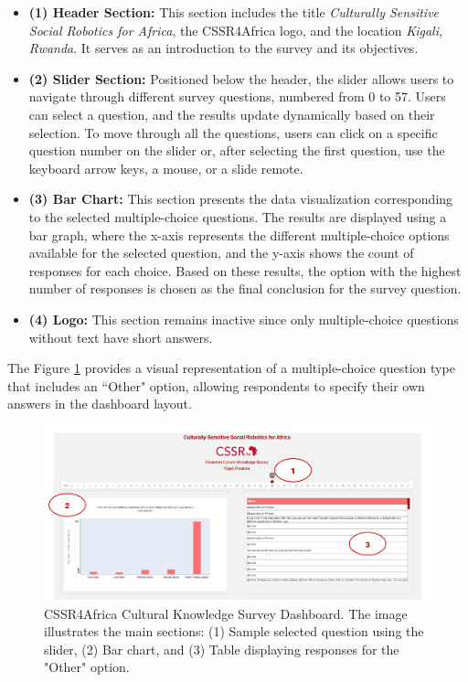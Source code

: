 \documentclass{CSSRforAfrica}
\begin{document}
\begin{itemize}
    \item \textbf{(1) Header Section:} This section includes the title \textit{Culturally Sensitive Social Robotics for Africa}, the CSSR4Africa logo, and the location \textit{Kigali, Rwanda}. It serves as an introduction to the survey and its objectives.
    
    \item \textbf{(2) Slider Section:} Positioned below the header, the slider allows users to navigate through different survey questions, numbered from 0 to 57. Users can select a question, and the results update dynamically based on their selection. To move through all the questions, users can click on a specific question number on the slider or, after selecting the first question, use the keyboard arrow keys, a mouse, or a slide remote.
    
    \item \textbf{(3) Bar Chart:} This section presents the data visualization corresponding to the selected multiple-choice questions. The results are displayed using a bar graph, where the x-axis represents the different multiple-choice options available for the selected question, and the y-axis shows the count of responses for each choice. Based on these results, the option with the highest number of responses is chosen as the final conclusion for the survey question.
    
    \item \textbf{(4) Logo:} This section remains inactive since only multiple-choice questions without text have short answers.
\end{itemize}
The Figure \ref{fig:dashboard4} provides a visual representation of a multiple-choice question type that includes an ``Other" option, allowing respondents to specify their own answers in the dashboard layout.
\begin{figure}[H]
    \centering
    \includegraphics[width=\textwidth]{images/dashboard44.png} 
    \caption{CSSR4Africa Cultural Knowledge Survey Dashboard. The image illustrates the main sections: (1) Sample selected question using the slider, (2) Bar chart, and (3) Table displaying responses for the "Other" option.}
    \label{fig:dashboard4}
\end{figure}
\end{document}
